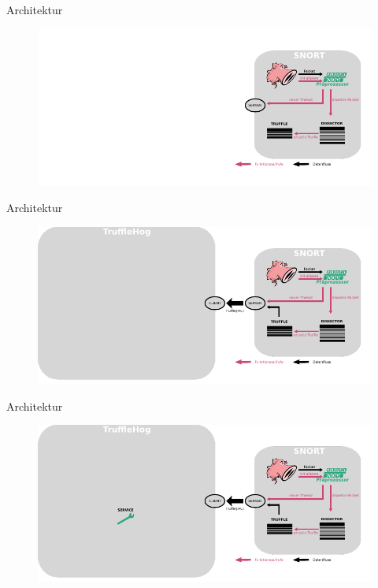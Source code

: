 \documentclass[18pt]{beamer}
\begin{document}
\begin{frame}{Architektur}
    \begin{figure}
    	\centering
    	\includegraphics[width=\textwidth]{./images/6.pdf}
    \end{figure}
\end{frame}

\begin{frame}{Architektur}
    \begin{figure}
    	\centering
    	\includegraphics[width=\textwidth]{./images/7.pdf}
    \end{figure}
\end{frame}

\begin{frame}{Architektur}
    \begin{figure}
    	\centering
    	\includegraphics[width=\textwidth]{./images/8.pdf}
    \end{figure}
\end{frame}
\end{document}
